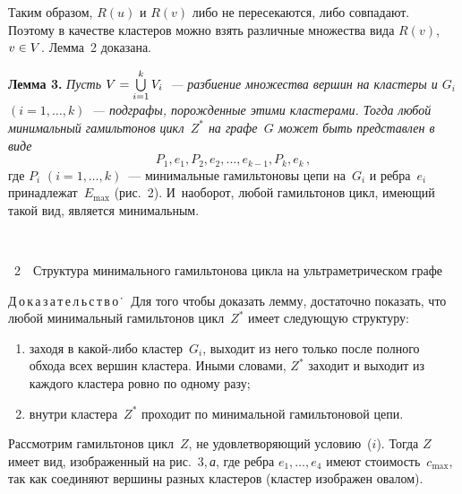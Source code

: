 \begin{multicols}{2}
Таким образом, $R(u)$ и $R(v)$ либо не пересекаются, либо совпадают.
Поэтому в качестве кластеров можно взять различные множества вида $R(v)$, $v \hm\in V$.
Лемма~2 доказана.


\smallskip

\noindent
\textbf{Лемма 3. }
\textit{Пусть $V \hm= \bigcup \limits_{i=1}^{k} V_i$~--- разбиение множества
вершин на кластеры и $G_i$ $(i=1,\ldots,k)$~---
подграфы, порожденные этими кластерами. Тогда любой минимальный
гамильтонов цикл~$Z^{*}$ на графе~$G$ может быть представлен в виде}
\begin{equation}
\label{min_ham_cycle}
P_1, e_1, P_2, e_2, \dots, e_{k-1}, P_k, e_k\,,
\end{equation}
где $P_i$ $(i=1,\dots,k)$~--- минимальные гамильтоновы цепи на~$G_i$ и
ребра~$e_i$ принадлежат~$E_{\max}$ (рис.~2).
И~наоборот, любой
гамильтонов цикл, имеющий такой вид, является минимальным.

\columnbreak

\noindent
\begin{center}  %
\mbox{%
\epsfxsize=73.449mm
}
 \end{center}

\vspace*{3pt}

 \noindent
{{\figurename~2}\ \ \small{Структура минимального гамильтонова цикла на
ультраметрическом графе}}


\vspace*{12pt}

\addtocounter{figure}{1}






\smallskip

\noindent
Д\,о\,к\,а\,з\,а\,т\,е\,л\,ь\,с\,т\,в\,о\.\ \
Для того чтобы доказать лемму, достаточно показать,
что любой минимальный гамильтонов цикл~$Z^{*}$ имеет следующую структуру:
\begin{enumerate}[($i$)]
\item заходя в ка\-кой-ли\-бо кластер~$G_i$,
выходит из него только после полного обхода всех вершин клас\-те\-ра. Иными словами,
$Z^{*}$ заходит и выходит из каждого кластера ровно по одному разу;
\item внутри кластера~$Z^{*}$ проходит по минимальной гамильтоновой цепи.
\end{enumerate}

Рассмотрим гамильтонов цикл~$Z$, не удовлетворяющий условию~($i$).
Тогда $Z$ имеет вид, изображенный на рис.~3,\,\textit{а}, где ребра
$e_1,\dots,e_4$ имеют стоимость~$c_{\max}$, так как соединяют вершины
разных кластеров (кластер изображен овалом).


\end{multicols}
